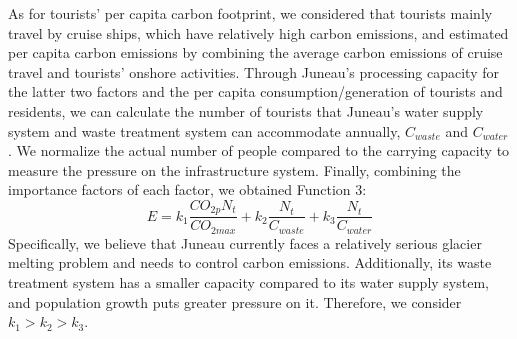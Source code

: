 \documentclass[12pt]{article}  %
\begin{document}
As for tourists' per capita carbon footprint, we considered that tourists mainly travel by cruise ships, which have relatively high carbon emissions, and estimated per capita carbon emissions by combining the average carbon emissions of cruise travel and tourists' onshore activities.
Through Juneau's processing capacity for the latter two factors and the per capita consumption/generation of tourists and residents, we can calculate the number of tourists that Juneau's water supply system and waste treatment system can accommodate annually, $C_{waste}$ and $C_{water}$. We normalize the actual number of people compared to the carrying capacity to measure the pressure on the infrastructure system. Finally, combining the importance factors of each factor, we obtained Function 3:
\begin{equation}
	E=k_{1}\frac{CO_{2p}N_{t}}{CO_{2max}}+k_{2}\frac{N_{t}}{C_{waste}}+k_{3}\frac{N_{t}}{C_{water}}
\end{equation}
Specifically, we believe that Juneau currently faces a relatively serious glacier melting problem and needs to control carbon emissions. Additionally, its waste treatment system has a smaller capacity compared to its water supply system, and population growth puts greater pressure on it. Therefore, we consider $k_1>k_2>k_3$.
\end{document}
